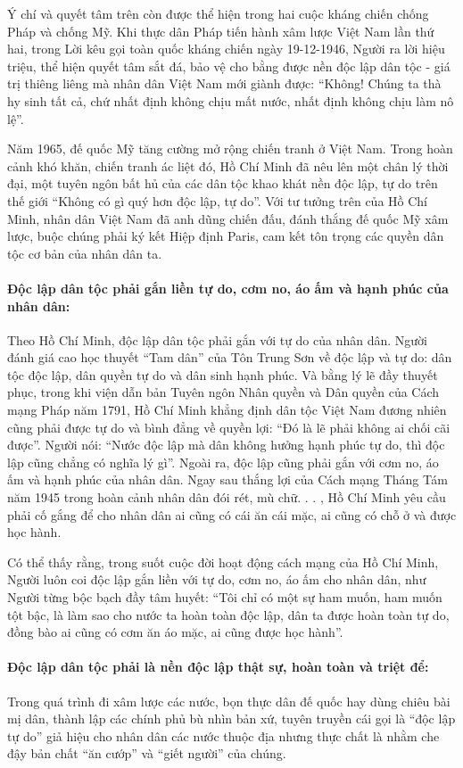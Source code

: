 Ý chí và quyết tâm trên còn được thể hiện trong hai cuộc kháng chiến chống Pháp và chống Mỹ. Khi thực dân Pháp tiến hành xâm lược Việt Nam lần thứ hai, trong Lời kêu gọi toàn quốc kháng chiến ngày 19-12-1946, Người ra lời hiệu triệu, thể hiện quyết tâm sắt đá, bảo vệ cho bằng được nền độc lập dân tộc - giá trị thiêng liêng mà nhân dân Việt Nam mới giành được: “Không! Chúng ta thà hy sinh tất cả, chứ nhất định không chịu mất nước, nhất định không chịu làm nô lệ”.

Năm 1965, đế quốc Mỹ tăng cường mở rộng chiến tranh ở Việt Nam. Trong hoàn cảnh khó khăn, chiến tranh ác liệt đó, Hồ Chí Minh đã nêu lên một chân lý thời đại, một tuyên ngôn bất hủ của các dân tộc khao khát nền độc lập, tự do trên thế giới “Không có gì quý hơn độc lập, tự do”. Với tư tưởng trên của Hồ Chí Minh, nhân dân Việt Nam đã anh dũng chiến đấu, đánh thắng đế quốc Mỹ xâm lược, buộc chúng phải ký kết Hiệp định Paris, cam kết tôn trọng các quyền dân tộc cơ bản của nhân dân ta.

\paragraph{Độc lập dân tộc phải gắn liền tự do, cơm no, áo ấm và hạnh phúc của nhân dân:}
Theo Hồ Chí Minh, độc lập dân tộc phải gắn với tự do của nhân dân. Người đánh giá cao học thuyết “Tam dân” của Tôn Trung Sơn về độc lập và tự do: dân tộc độc lập, dân quyền tự do và dân sinh hạnh phúc. Và bằng lý lẽ đầy thuyết phục, trong khi viện dẫn bản Tuyên ngôn Nhân quyền và Dân quyền của Cách mạng Pháp năm 1791, Hồ Chí Minh khẳng định dân tộc Việt Nam đương nhiên cũng phải được tự do và bình đẳng về quyền lợi: “Đó là lẽ phải không ai chối cãi được”. Người nói: “Nước độc lập mà dân không hưởng hạnh phúc tự do, thì độc lập cũng chẳng có nghĩa lý gì”. Ngoài ra, độc lập cũng phải gắn với cơm no, áo ấm và hạnh phúc của nhân dân. Ngay sau thắng lợi của Cách mạng Tháng Tám năm 1945 trong hoàn cảnh nhân dân đói rét, mù chữ. . . , Hồ Chí Minh yêu cầu phải cố gắng để cho nhân dân ai cũng có cái ăn cái mặc, ai cũng có chỗ ở và được học hành.

Có thể thấy rằng, trong suốt cuộc đời hoạt động cách mạng của Hồ Chí Minh, Người luôn coi độc lập gắn liền với tự do, cơm no, áo ấm cho nhân dân, như Người từng bộc bạch đầy tâm huyết: “Tôi chỉ có một sự ham muốn, ham muốn tột bậc, là làm sao cho nước ta hoàn toàn độc lập, dân ta được hoàn toàn tự do, đồng bào ai cũng có cơm ăn áo mặc, ai cũng được học hành”.

\paragraph{Độc lập dân tộc phải là nền độc lập thật sự, hoàn toàn và triệt để:}
Trong quá trình đi xâm lược các nước, bọn thực dân đế quốc hay dùng chiêu bài mị dân, thành lập các chính phủ bù nhìn bản xứ, tuyên truyền cái gọi là “độc lập tự do” giả hiệu cho nhân dân các nước thuộc địa nhưng thực chất là nhằm che đậy bản chất “ăn cướp” và “giết người” của chúng.

